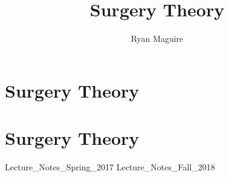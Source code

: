 \documentclass[crop=false,class=book,oneside]{standalone}
\begin{document}
    \newif\ifmathcoursessurgery
    \ifx\ifmathcourses\undefined
        \title{Surgery Theory}
        \author{Ryan Maguire}
        \date{\vspace{-5ex}}
        \maketitle
        \tableofcontents
        \listoffigures
        \clearpage
        \chapter*{Surgery Theory}
        \setcounter{chapter}{1}
    \else
        \chapter{Surgery Theory}
        
    \fi
    {Lecture_Notes_Spring_2017}
    {Lecture_Notes_Fall_2018}
\end{document}
